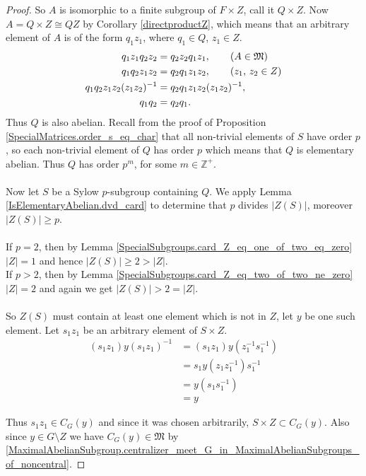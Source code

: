 \begin{footnotesize}
\begin{proof}
  So $A$ is isomorphic to a finite subgroup of $F \times Z$, call it $Q \times Z$. Now $A = Q \times Z \cong QZ$ by Corollary \ref{directproductZ}, which means that an arbitrary element of $A$ is of the form $q_1z_1$, where $q_1 \in Q$, $z_1 \in Z$.
  \begin{align*} q_1z_1q_2z_2 &= q_2z_2 q_1z_1, \tag{$A \in \mathfrak{M}$}
  \\ q_1q_2z_1z_2 &= q_2q_1z_1z_2, \tag{$z_1$, $z_2 \in Z$}
  \\  q_1q_2z_1z_2(z_1z_2)^{-1} &= q_2q_1z_1z_2(z_1z_2)^{-1},
  \\ q_1q_2 &= q_2q_1.
  \end{align*}
  Thus $Q$ is also abelian. Recall from the proof of Proposition \ref{SpecialMatrices.order_s_eq_char} that all non-trivial elements of $S$ have order $p$, so each non-trivial element of $Q$ has order $p$ which means that $Q$ is elementary abelian. Thus $Q$ has order $p^m$, for some $m \in \mathbb{Z}^+$. \\
  \\
  Now let $S$ be a Sylow $p$-subgroup containing $Q$. We apply Lemma \ref{IsElementaryAbelian.dvd_card} to determine that $p$ divides $|Z(S)|$, moreover $|Z(S)| \geq p$. \\
  \\
  If $p=2$, then by Lemma \ref{SpecialSubgroups.card_Z_eq_one_of_two_eq_zero} $|Z| = 1$ and hence $|Z(S)| \geq 2 > |Z|$.\\
  If $p > 2$, then by Lemma \ref{SpecialSubgroups.card_Z_eq_two_of_two_ne_zero} $|Z| = 2$ and again we get $|Z(S)| > 2 = |Z|$. \\
  \\
  So $Z(S)$ must contain at least one element which is not in $Z$, let $y$ be one such element. Let $s_1z_1$ be an arbitrary element of $S \times Z$.
  \begin{align*}
  (s_1z_1)y(s_1z_1)^{-1} &= (s_1z_1)y(z_1^{-1}s_1^{-1})
  \\ &= s_1y(z_1z_1^{-1})s_1^{-1} \tag{since $y \in L$, $z_1 \in Z$}
  \\ &= y(s_1s_1^{-1}) \tag{since $s_1 \in S$, $y \in Z(S)$}
  \\ &= y
  \end{align*}
  
  Thus $s_1z_1 \in C_G(y)$ and since it was chosen arbitrarily, $S \times Z \subset C_G(y)$. Also since $y \in G \! \setminus \! Z$ we have $C_G(y) \in \mathfrak{M}$ by \ref{MaximalAbelianSubgroup.centralizer_meet_G_in_MaximalAbelianSubgroups_of_noncentral}.
\end{proof}





\end{footnotesize}
